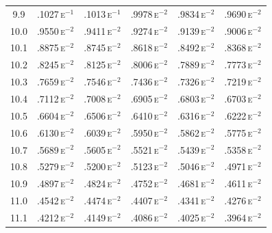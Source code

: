 \begin{minipage}[t]{95mm}
{\begin{tabular}{cccccc}
        9.9            & .1027\,\textsc{e}$^{-1}$ & .1013\,\textsc{e}$^{-1}$ & .9978\,\textsc{e}$^{-2}$ & .9834\,\textsc{e}$^{-2}$ & .9690\,\textsc{e}$^{-2}$ \\[1.5ex]
        10.0           & .9550\,\textsc{e}$^{-2}$ & .9411\,\textsc{e}$^{-2}$ & .9274\,\textsc{e}$^{-2}$ & .9139\,\textsc{e}$^{-2}$ & .9006\,\textsc{e}$^{-2}$ \\
        10.1           & .8875\,\textsc{e}$^{-2}$ & .8745\,\textsc{e}$^{-2}$ & .8618\,\textsc{e}$^{-2}$ & .8492\,\textsc{e}$^{-2}$ & .8368\,\textsc{e}$^{-2}$ \\
        10.2           & .8245\,\textsc{e}$^{-2}$ & .8125\,\textsc{e}$^{-2}$ & .8006\,\textsc{e}$^{-2}$ & .7889\,\textsc{e}$^{-2}$ & .7773\,\textsc{e}$^{-2}$ \\
        10.3           & .7659\,\textsc{e}$^{-2}$ & .7546\,\textsc{e}$^{-2}$ & .7436\,\textsc{e}$^{-2}$ & .7326\,\textsc{e}$^{-2}$ & .7219\,\textsc{e}$^{-2}$ \\
        10.4           & .7112\,\textsc{e}$^{-2}$ & .7008\,\textsc{e}$^{-2}$ & .6905\,\textsc{e}$^{-2}$ & .6803\,\textsc{e}$^{-2}$ & .6703\,\textsc{e}$^{-2}$ \\
        10.5           & .6604\,\textsc{e}$^{-2}$ & .6506\,\textsc{e}$^{-2}$ & .6410\,\textsc{e}$^{-2}$ & .6316\,\textsc{e}$^{-2}$ & .6222\,\textsc{e}$^{-2}$ \\
        10.6           & .6130\,\textsc{e}$^{-2}$ & .6039\,\textsc{e}$^{-2}$ & .5950\,\textsc{e}$^{-2}$ & .5862\,\textsc{e}$^{-2}$ & .5775\,\textsc{e}$^{-2}$ \\
        10.7           & .5689\,\textsc{e}$^{-2}$ & .5605\,\textsc{e}$^{-2}$ & .5521\,\textsc{e}$^{-2}$ & .5439\,\textsc{e}$^{-2}$ & .5358\,\textsc{e}$^{-2}$ \\
        10.8           & .5279\,\textsc{e}$^{-2}$ & .5200\,\textsc{e}$^{-2}$ & .5123\,\textsc{e}$^{-2}$ & .5046\,\textsc{e}$^{-2}$ & .4971\,\textsc{e}$^{-2}$ \\
        10.9           & .4897\,\textsc{e}$^{-2}$ & .4824\,\textsc{e}$^{-2}$ & .4752\,\textsc{e}$^{-2}$ & .4681\,\textsc{e}$^{-2}$ & .4611\,\textsc{e}$^{-2}$ \\[1.5ex]
        11.0           & .4542\,\textsc{e}$^{-2}$ & .4474\,\textsc{e}$^{-2}$ & .4407\,\textsc{e}$^{-2}$ & .4341\,\textsc{e}$^{-2}$ & .4276\,\textsc{e}$^{-2}$ \\
        11.1           & .4212\,\textsc{e}$^{-2}$ & .4149\,\textsc{e}$^{-2}$ & .4086\,\textsc{e}$^{-2}$ & .4025\,\textsc{e}$^{-2}$ & .3964\,\textsc{e}$^{-2}$ \\

\end{tabular}}
\end{minipage}
